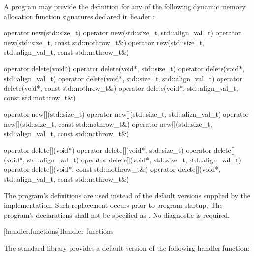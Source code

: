 \pnum
A \Cpp{} program may provide the definition for any of the following
dynamic memory allocation function signatures declared in header
:

%
%
\begin{codeblock}
operator new(std::size_t)
operator new(std::size_t, std::align_val_t)
operator new(std::size_t, const std::nothrow_t&)
operator new(std::size_t, std::align_val_t, const std::nothrow_t&)
\end{codeblock}%
%
%
\begin{codeblock}
operator delete(void*)
operator delete(void*, std::size_t)
operator delete(void*, std::align_val_t)
operator delete(void*, std::size_t, std::align_val_t)
operator delete(void*, const std::nothrow_t&)
operator delete(void*, std::align_val_t, const std::nothrow_t&)
\end{codeblock}%
%
%
\begin{codeblock}
operator new[](std::size_t)
operator new[](std::size_t, std::align_val_t)
operator new[](std::size_t, const std::nothrow_t&)
operator new[](std::size_t, std::align_val_t, const std::nothrow_t&)
\end{codeblock}%
%
%
\begin{codeblock}
operator delete[](void*)
operator delete[](void*, std::size_t)
operator delete[](void*, std::align_val_t)
operator delete[](void*, std::size_t, std::align_val_t)
operator delete[](void*, const std::nothrow_t&)
operator delete[](void*, std::align_val_t, const std::nothrow_t&)
\end{codeblock}

\pnum
The program's definitions are used instead of the default versions supplied by
the implementation.
Such replacement occurs prior to program startup.
%
The program's declarations shall not be specified as
.
No diagnostic is required.

[handler.functions]{Handler functions}

\pnum
The \Cpp{} standard library provides a default version of the following handler
function:

